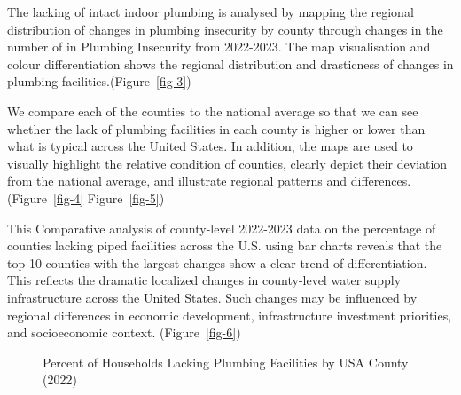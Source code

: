 \documentclass[
  letterpaper,
  DIV=11,
  numbers=noendperiod]{scrartcl}
\begin{document}
The lacking of intact indoor plumbing is analysed by mapping the
regional distribution of changes in plumbing insecurity by county
through changes in the number of in Plumbing Insecurity from 2022-2023.
The map visualisation and colour differentiation shows the regional
distribution and drasticness of changes in plumbing
facilities.(Figure~\ref{fig-3})

We compare each of the counties to the national average so that we can
see whether the lack of plumbing facilities in each county is higher or
lower than what is typical across the United States. In addition, the
maps are used to visually highlight the relative condition of counties,
clearly depict their deviation from the national average, and illustrate
regional patterns and differences.(Figure~\ref{fig-4}
Figure~\ref{fig-5})

This Comparative analysis of county-level 2022-2023 data on the
percentage of counties lacking piped facilities across the U.S. using
bar charts reveals that the top 10 counties with the largest changes
show a clear trend of differentiation. This reflects the dramatic
localized changes in county-level water supply infrastructure across the
United States. Such changes may be influenced by regional differences in
economic development, infrastructure investment priorities, and
socioeconomic context. (Figure~\ref{fig-6})

\begin{figure}


\caption{\label{fig-1}Percent of Households Lacking Plumbing Facilities
by USA County (2022)}

\end{figure}%
\end{document}
